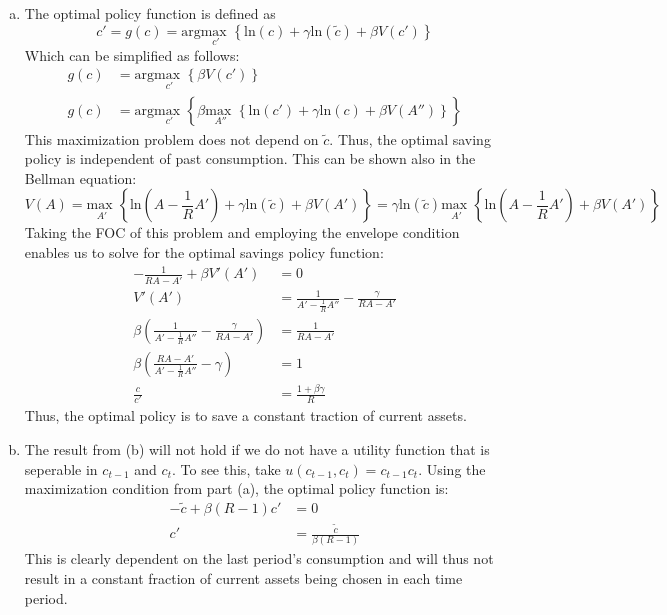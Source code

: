 \documentclass{article}
\newcommand{\loge}[1]{\text{ln}\left(#1\right)}
\newcommand{\usmax}[1]{\underset{#1}{\text{max }}}
\begin{document}
\begin{enumerate}[(a)]
	\item The optimal policy function is defined as
		\[
			c' = g(c) = \text{arg}\usmax{c'}\left\{\loge{c} + \gamma\loge{\tilde{c}} + \beta V(c')\right\}
		\]
		Which can be simplified as follows:
		\begin{align*}
			g(c) 	&= \text{arg}\usmax{c'}\left\{\beta V(c')\right\}	\\
			g(c) 	&= \text{arg}\usmax{c'}\left\{\beta \usmax{A''}\left\{  \loge{c'} + \gamma\loge{c} + \beta V(A'')\right\}\right\} 
		\end{align*}
		This maximization problem does not depend on $\tilde{c}$. Thus, the optimal saving policy is independent of past consumption. This can be shown also in the Bellman equation:
		\[
			V(A) = \usmax{A'}\left\{\loge{A-\frac{1}{R}A'} + \gamma\loge{\tilde{c}} + \beta V(A')\right\}= \gamma\loge{\tilde{c}}\usmax{A'}\left\{\loge{A-\frac{1}{R}A'} + \beta V(A')\right\}
		\]
		Taking the FOC of this problem and employing the envelope condition enables us to solve for the optimal savings policy function:
		\begin{align*}
			-\frac{1}{RA-A'} + \beta V'(A') &= 0	\\
			V'(A') &= \frac{1}{A'-\frac{1}{R}A''} - \frac{\gamma}{RA-A'}	\\
			\beta\left(\frac{1}{A'-\frac{1}{R}A''} - \frac{\gamma}{RA-A'}\right) &= \frac{1}{RA-A'}	\\
			\beta\left(\frac{RA-A'}{A'-\frac{1}{R}A''} -\gamma\right) &= 1 \\
			\frac{c}{c'} &= \frac{1+\beta\gamma}{R}
		\end{align*}
		Thus, the optimal policy is to save a constant traction of current assets.
		
	\item The result from (b) will not hold if we do not have a utility function that is seperable in $c_{t-1}$ and $c_t$. To see this, take ${u(c_{t-1},c_t)=c_{t-1}c_t}$. Using the maximization condition from part (a), the optimal policy function is:
		\begin{align*}
			-\tilde{c} + \beta(R-1)c' &= 0	\\
			c' &= \frac{\tilde{c}}{\beta(R-1)}
		\end{align*}
		This is clearly dependent on the last period's consumption and will thus not result in a constant fraction of current assets being chosen in each time period.
	
\end{enumerate}

\end{document}
